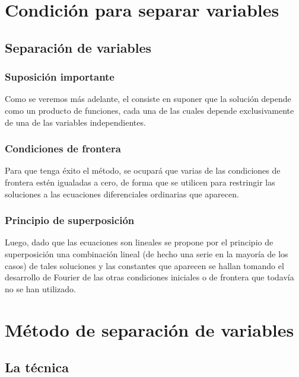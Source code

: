 \documentclass[12pt]{beamer}
\begin{document}
\section{Condición para separar variables}
\subsection{Separación de variables}

\begin{frame}
\frametitle{Suposición importante}
Como se veremos más adelante, el  consiste en suponer que la solución depende como un producto de funciones, cada una de las cuales depende exclusivamente de una de las variables independientes.
\end{frame}
\begin{frame}
\frametitle{Condiciones de frontera}
Para que tenga éxito el método, se ocupará que varias de las condiciones de frontera estén igualadas a cero, de forma que se utilicen para restringir las soluciones a las ecuaciones diferenciales ordinarias que aparecen.
\end{frame}
\begin{frame}
\frametitle{Principio de superposición}
Luego, dado que las ecuaciones son lineales se propone por el principio de superposición una combinación lineal (de hecho una serie en la mayoría de los casos) de tales soluciones y las constantes que aparecen se hallan tomando el desarrollo de Fourier de las otras condiciones iniciales o de frontera que todavía no se han utilizado.
\end{frame}

\section{Método de separación de variables}
\subsection{La técnica}
\end{document}
